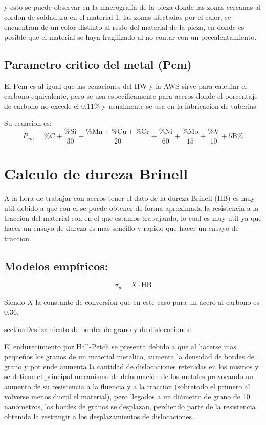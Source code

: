 \documentclass[12pt,a4paper]{article}
\begin{document}
y esto se puede observar en la macrografía de la pieza donde las zonas cercanas al cordon de soldadura en el material 1, las zonas afectadas por el calor, se encuentran de un color distinto al resto del material de la pieza, en donde es posible que el material se haya fragilizado al no contar con un precalentamiento.

\subsection{Parametro critico del metal (Pcm)}
El Pcm es al igual que las ecuaciones del IIW y la AWS sirve para calcular el carbono equivalente, pero se usa especificamente para aceros donde el porcentaje de carbono no excede el 0,11\% y usualmente se usa en la fabricacion de tuberias

Su ecuacion es:
\begin{equation}
    P_{cm} = \text{\%C} + \frac{\text{\%Si}}{30} + \frac{\text{\%Mn}+\text{\%Cu}+\text{\%Cr}}{20} + \frac{\text{\%Ni}}{60} + \frac{\text{\%Mo}}{15} + \frac{\text{\%V}}{10} + \text{5B\%}
\end{equation}

\section{Calculo de dureza Brinell}

A la hora de trabajar con aceros tener el dato de la dureza Brinell (HB) es muy util debido a que con el se puede obtener de forma aproximada la resistencia a la traccion del material con en el que estamos trabajando, 
lo cual es muy util ya que hacer un ensayo de dureza es mas sencillo y rapido que hacer un ensayo de traccion.

\subsection{Modelos empíricos:}

\begin{equation}
    \sigma_y = X \cdot \text{HB}
\end{equation}

Siendo $X$ la constante de conversion que en este caso para un acero al carbono es 0,36.


section{Deslizamiento de bordes de grano y de dislocaciones: }

El endurecimiento por Hall-Petch se presenta debido a que al hacerse mas pequeños los granos de un material metalico, aumenta la densidad de bordes de grano y por ende aumenta la cantidad de dislocaciones retenidas en los mismos y se detiene el principal mecanismo de deformación de los metales provocando un aumento de su resistencia a la fluencia y a la traccion (sobretodo el primero al volverse menos ductil el material), pero llegados a un diámetro de grano de 10 nanómetros, los bordes de granos se desplazan, perdiendo parte de la resistencia obtenida la restringir a los desplazamientos de dislocaciones.
\end{document}
